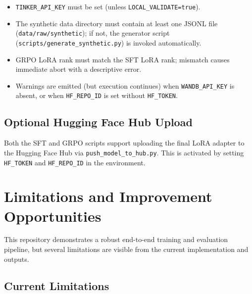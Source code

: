 \documentclass[12pt, a4paper]{article}
\begin{document}
\begin{itemize}[leftmargin=1.5em, itemsep=3pt]
  \item \texttt{TINKER\_API\_KEY} must be set (unless \texttt{LOCAL\_VALIDATE=true}).
  \item The synthetic data directory must contain at least one JSONL file
    (\texttt{data/raw/synthetic}); if not, the generator script
    (\texttt{scripts/generate\_synthetic.py}) is invoked automatically.
  \item GRPO LoRA rank must match the SFT LoRA rank; mismatch causes immediate
    abort with a descriptive error.
  \item Warnings are emitted (but execution continues) when \texttt{WANDB\_API\_KEY}
    is absent, or when \texttt{HF\_REPO\_ID} is set without \texttt{HF\_TOKEN}.
\end{itemize}

\subsection{Optional Hugging Face Hub Upload}

Both the SFT and GRPO scripts support uploading the final LoRA adapter to the
Hugging Face Hub via \texttt{push\_model\_to\_hub.py}. This is activated by
setting \texttt{HF\_TOKEN} and \texttt{HF\_REPO\_ID} in the environment.

\section{Limitations and Improvement Opportunities}

This repository demonstrates a robust end-to-end training and evaluation
pipeline, but several limitations are visible from the current implementation
and outputs.

\subsection{Current Limitations}
\end{document}
